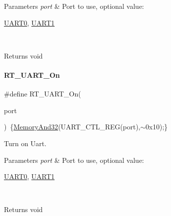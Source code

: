 \begin{DoxyParams}{Parameters}
{\em port} & Port to use, optional value\+:
\begin{DoxyCode}
\mbox{\hyperlink{a00098_a0508661f121639ffdee7de2353a0def2}{UART0}}, \mbox{\hyperlink{a00098_a8d69bf04d07af4fbbab5a8bd291f65ff}{UART1}}
\end{DoxyCode}
 \\
\hline
\end{DoxyParams}
\begin{DoxyReturn}{Returns}
void 
\end{DoxyReturn}
\mbox{\label{a00098_a7c1428a7b16eec7fe710679dd70b4069}} 
\paragraph{\texorpdfstring{R\+T\+\_\+\+U\+A\+R\+T\+\_\+\+On}{RT\_UART\_On}}
{\footnotesize\ttfamily \#define R\+T\+\_\+\+U\+A\+R\+T\+\_\+\+On(\begin{DoxyParamCaption}\item[{}]{port }\end{DoxyParamCaption})~\{\mbox{\hyperlink{a00026_ad87cedffcaadc51db22594fce55173d4}{Memory\+And32}}(U\+A\+R\+T\+\_\+\+C\+T\+L\+\_\+\+R\+EG(port),$\sim$0x10);\}}



Turn on Uart. 


\begin{DoxyParams}{Parameters}
{\em port} & Port to use, optional value\+:
\begin{DoxyCode}
\mbox{\hyperlink{a00098_a0508661f121639ffdee7de2353a0def2}{UART0}}, \mbox{\hyperlink{a00098_a8d69bf04d07af4fbbab5a8bd291f65ff}{UART1}}
\end{DoxyCode}
 \\
\hline
\end{DoxyParams}
\begin{DoxyReturn}{Returns}
void 
\end{DoxyReturn}
\mbox{\label{a00098_ad8934a303c429b70176995f2dd6ac67b}} 
